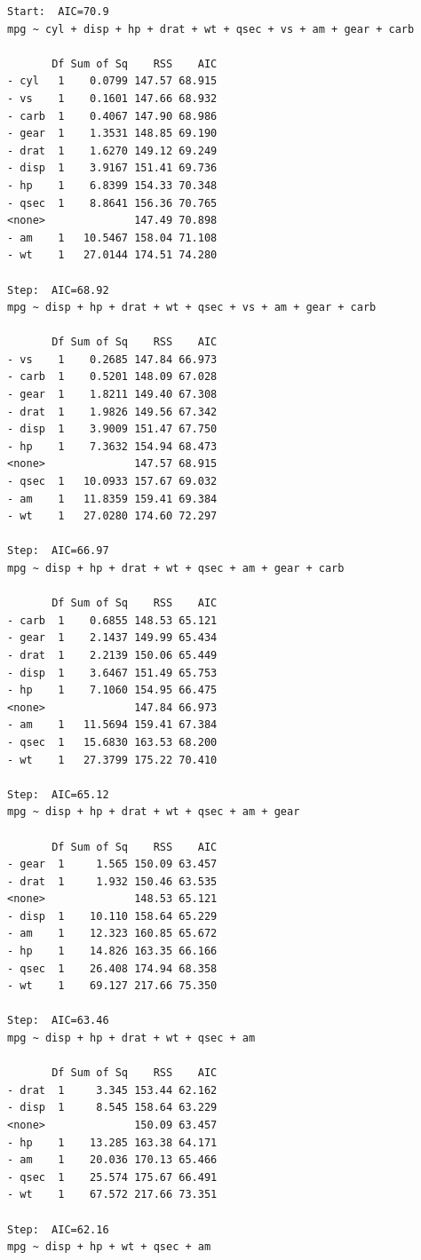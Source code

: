 \documentclass{article}\usepackage[]{graphicx}\usepackage[]{xcolor}
\begin{document}
\begin{verbatim}
Start:  AIC=70.9
mpg ~ cyl + disp + hp + drat + wt + qsec + vs + am + gear + carb

       Df Sum of Sq    RSS    AIC
- cyl   1    0.0799 147.57 68.915
- vs    1    0.1601 147.66 68.932
- carb  1    0.4067 147.90 68.986
- gear  1    1.3531 148.85 69.190
- drat  1    1.6270 149.12 69.249
- disp  1    3.9167 151.41 69.736
- hp    1    6.8399 154.33 70.348
- qsec  1    8.8641 156.36 70.765
<none>              147.49 70.898
- am    1   10.5467 158.04 71.108
- wt    1   27.0144 174.51 74.280

Step:  AIC=68.92
mpg ~ disp + hp + drat + wt + qsec + vs + am + gear + carb

       Df Sum of Sq    RSS    AIC
- vs    1    0.2685 147.84 66.973
- carb  1    0.5201 148.09 67.028
- gear  1    1.8211 149.40 67.308
- drat  1    1.9826 149.56 67.342
- disp  1    3.9009 151.47 67.750
- hp    1    7.3632 154.94 68.473
<none>              147.57 68.915
- qsec  1   10.0933 157.67 69.032
- am    1   11.8359 159.41 69.384
- wt    1   27.0280 174.60 72.297

Step:  AIC=66.97
mpg ~ disp + hp + drat + wt + qsec + am + gear + carb

       Df Sum of Sq    RSS    AIC
- carb  1    0.6855 148.53 65.121
- gear  1    2.1437 149.99 65.434
- drat  1    2.2139 150.06 65.449
- disp  1    3.6467 151.49 65.753
- hp    1    7.1060 154.95 66.475
<none>              147.84 66.973
- am    1   11.5694 159.41 67.384
- qsec  1   15.6830 163.53 68.200
- wt    1   27.3799 175.22 70.410

Step:  AIC=65.12
mpg ~ disp + hp + drat + wt + qsec + am + gear

       Df Sum of Sq    RSS    AIC
- gear  1     1.565 150.09 63.457
- drat  1     1.932 150.46 63.535
<none>              148.53 65.121
- disp  1    10.110 158.64 65.229
- am    1    12.323 160.85 65.672
- hp    1    14.826 163.35 66.166
- qsec  1    26.408 174.94 68.358
- wt    1    69.127 217.66 75.350

Step:  AIC=63.46
mpg ~ disp + hp + drat + wt + qsec + am

       Df Sum of Sq    RSS    AIC
- drat  1     3.345 153.44 62.162
- disp  1     8.545 158.64 63.229
<none>              150.09 63.457
- hp    1    13.285 163.38 64.171
- am    1    20.036 170.13 65.466
- qsec  1    25.574 175.67 66.491
- wt    1    67.572 217.66 73.351

Step:  AIC=62.16
mpg ~ disp + hp + wt + qsec + am


\end{verbatim}
\end{document}
